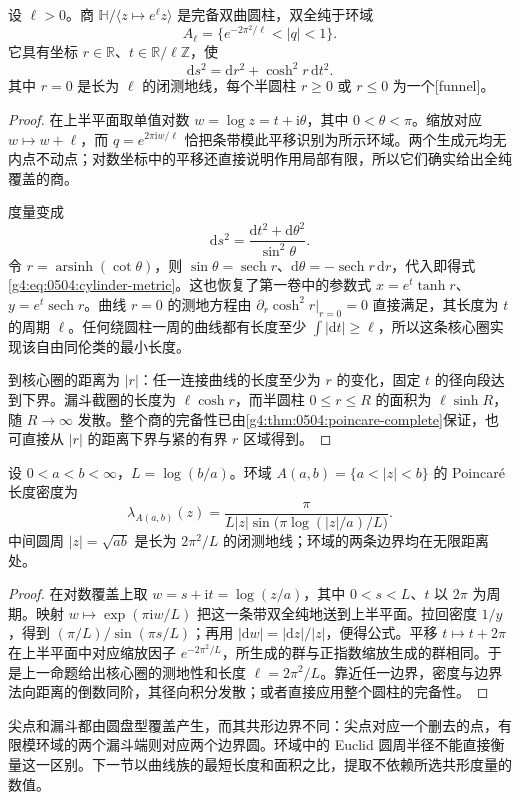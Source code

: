 \begin{proposition}
	\label{g4:prop:0504:hyperbolic-cylinder}
	设 \(\ell>0\)。商 \(\mathbb H/\langle z\mapsto e^\ell z\rangle\) 是完备双曲圆柱，双全纯于环域
	\[
		A_\ell=\{e^{-2\pi^2/\ell}<|q|<1\}.
	\]
	它具有坐标 \(r\in\mathbb R\)、\(t\in\mathbb R/\ell\mathbb Z\)，使
	\begin{equation}
		\label{g4:eq:0504:cylinder-metric}
		\mathrm{d}s^2=\mathrm{d}r^2+\cosh^2r\,\mathrm{d}t^2.
	\end{equation}
	其中 \(r=0\) 是长为 \(\ell\) 的闭测地线，每个半圆柱 \(r\ge0\) 或 \(r\le0\) 为一个[funnel]。
\end{proposition}
\begin{proof}
	在上半平面取单值对数 \(w=\log z=t+\mathrm{i}\theta\)，其中 \(0<\theta<\pi\)。缩放对应 \(w\mapsto w+\ell\)，而 \(q=e^{2\pi\mathrm{i}w/\ell}\) 恰把条带模此平移识别为所示环域。两个生成元均无内点不动点；对数坐标中的平移还直接说明作用局部有限，所以它们确实给出全纯覆盖的商。

	度量变成
	\[
		\mathrm{d}s^2=\frac{\mathrm{d}t^2+\mathrm{d}\theta^2}{\sin^2\theta}.
	\]
	令 \(r=\operatorname{arsinh}(\cot\theta)\)，则 \(\sin\theta=\operatorname{sech}r\)、\(\mathrm{d}\theta=-\operatorname{sech}r\,\mathrm{d}r\)，代入即得式\eqref{g4:eq:0504:cylinder-metric}。这也恢复了第一卷中的参数式 \(x=e^t\tanh r\)、\(y=e^t\operatorname{sech}r\)。曲线 \(r=0\) 的测地方程由 \(\partial_r\cosh^2r|_{r=0}=0\) 直接满足，其长度为 \(t\) 的周期 \(\ell\)。任何绕圆柱一周的曲线都有长度至少 \(\int|\mathrm{d}t|\ge\ell\)，所以这条核心圈实现该自由同伦类的最小长度。

	到核心圈的距离为 \(|r|\)：任一连接曲线的长度至少为 \(r\) 的变化，固定 \(t\) 的径向段达到下界。漏斗截圈的长度为 \(\ell\cosh r\)，而半圆柱 \(0\le r\le R\) 的面积为 \(\ell\sinh R\)，随 \(R\to\infty\) 发散。整个商的完备性已由\cref{g4:thm:0504:poincare-complete}保证，也可直接从 \(|r|\) 的距离下界与紧的有界 \(r\) 区域得到。
\end{proof}

\begin{corollary}
	\label{g4:cor:0504:annulus-metric}
	设 \(0<a<b<\infty\)，\(L=\log(b/a)\)。环域 \(A(a,b)=\{a<|z|<b\}\) 的 Poincaré 长度密度为
	\begin{equation}
		\label{g4:eq:0504:annulus-density}
		\lambda_{A(a,b)}(z)
		=\frac{\pi}{L|z|\sin\bigl(\pi\log(|z|/a)/L\bigr)}.
	\end{equation}
	中间圆周 \(|z|=\sqrt{ab}\) 是长为 \(2\pi^2/L\) 的闭测地线；环域的两条边界均在无限距离处。
\end{corollary}
\begin{proof}
	在对数覆盖上取 \(w=s+\mathrm{i}t=\log(z/a)\)，其中 \(0<s<L\)、\(t\) 以 \(2\pi\) 为周期。映射 \(w\mapsto\exp(\pi\mathrm{i}w/L)\) 把这一条带双全纯地送到上半平面。拉回密度 \(1/y\)，得到 \((\pi/L)/\sin(\pi s/L)\)；再用 \(|\mathrm{d}w|=|\mathrm{d}z|/|z|\)，便得公式。平移 \(t\mapsto t+2\pi\) 在上半平面中对应缩放因子 \(e^{-2\pi^2/L}\)，所生成的群与正指数缩放生成的群相同。于是上一命题给出核心圈的测地性和长度 \(\ell=2\pi^2/L\)。靠近任一边界，密度与边界法向距离的倒数同阶，其径向积分发散；或者直接应用整个圆柱的完备性。
\end{proof}

尖点和漏斗都由圆盘型覆盖产生，而其共形边界不同：尖点对应一个删去的点，有限模环域的两个漏斗端则对应两个边界圆。环域中的 Euclid 圆周半径不能直接衡量这一区别。下一节以曲线族的最短长度和面积之比，提取不依赖所选共形度量的数值。
